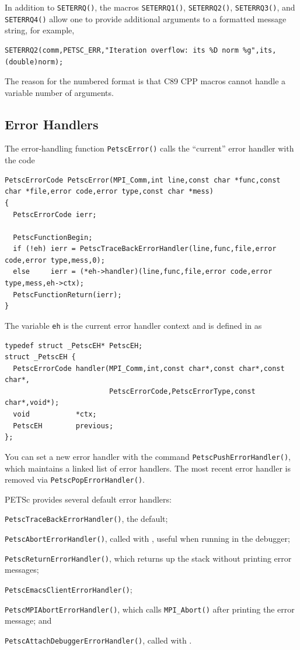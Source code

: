 In addition to \lstinline{SETERRQ()}, the macros \lstinline{SETERRQ1()}, \lstinline{SETERRQ2()}, \lstinline{SETERRQ3()},
and \lstinline{SETERRQ4()}  allow one to provide additional arguments to a formatted message string, for example,
\begin{lstlisting}
SETERRQ2(comm,PETSC_ERR,"Iteration overflow: its %D norm %g",its,(double)norm);
\end{lstlisting}
The reason for the numbered format is that C89 CPP macros cannot handle a variable number
of arguments.

\subsection{Error Handlers}
The error-handling function \lstinline{PetscError()} calls the ``current'' error handler
with the code
\begin{lstlisting}
PetscErrorCode PetscError(MPI_Comm,int line,const char *func,const char *file,error code,error type,const char *mess)
{
  PetscErrorCode ierr;

  PetscFunctionBegin;
  if (!eh) ierr = PetscTraceBackErrorHandler(line,func,file,error code,error type,mess,0);
  else     ierr = (*eh->handler)(line,func,file,error code,error type,mess,eh->ctx);
  PetscFunctionReturn(ierr);
}
\end{lstlisting}
The variable \lstinline{eh} is the current error handler context and is defined in
 \href{http://www.mcs.anl.gov/petsc/petsc-master/src/sys/error/err.c.html}{} as
\begin{lstlisting}
typedef struct _PetscEH* PetscEH;
struct _PetscEH {
  PetscErrorCode handler(MPI_Comm,int,const char*,const char*,const char*,
                         PetscErrorCode,PetscErrorType,const char*,void*);
  void           *ctx;
  PetscEH        previous;
};
\end{lstlisting}

You can set a new error handler with the command \lstinline{PetscPushErrorHandler()},
which maintains a linked list of error handlers.
The most recent error handler is removed
via \lstinline{PetscPopErrorHandler()}.

PETSc provides several default error handlers:
\begin{tightitemize}
  \item \lstinline{PetscTraceBackErrorHandler()}, the default;
  \item \lstinline{PetscAbortErrorHandler()}, called with , useful when running in the debugger;
  \item \lstinline{PetscReturnErrorHandler()}, which returns up the stack without printing error messages;
  \item \lstinline{PetscEmacsClientErrorHandler()};
  \item \lstinline{PetscMPIAbortErrorHandler()}, which calls \lstinline{MPI_Abort()} after printing the error message; and
  \item \lstinline{PetscAttachDebuggerErrorHandler()}, called with .
\end{tightitemize}

